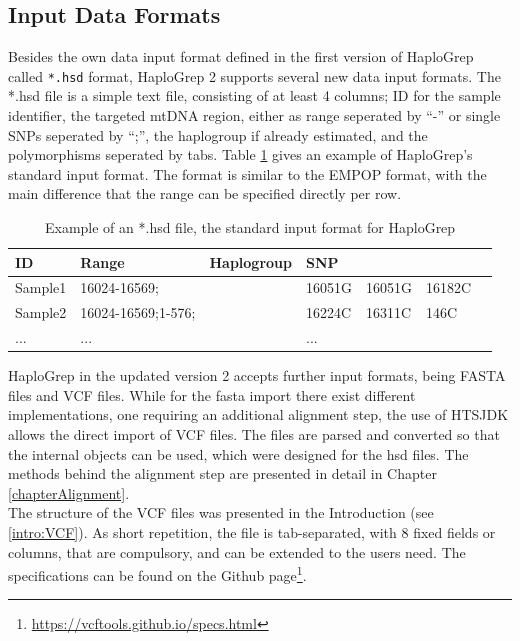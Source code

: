 \subsection{Input Data Formats}\label{hg:input}
Besides the own data input format defined in the first version of HaploGrep called \verb|*.hsd| format, HaploGrep 2 supports several new data input formats. 
The *.hsd file is a simple text file, consisting of at least 4 columns; ID for the sample identifier, the targeted mtDNA region, either as range seperated by "`-"' or single SNPs seperated by "`;"', the haplogroup if already estimated, and the polymorphisms seperated by tabs. Table \ref{table:hsd} gives an example of HaploGrep's standard input format.
The format is similar to the EMPOP format\cite{Parson2007}, with the main difference that the range can be specified directly per row.
\begin{table}[H]
  \begin{tabular}{lllllll}
    \toprule
    ID & Range & Haplogroup & SNP &  &  \\
		\midrule
	Sample1 & 16024-16569; &  & 16051G & 16051G & 16182C\\
	Sample2 & 16024-16569;1-576; &  & 16224C & 16311C & 146C\\
	... & ... & & ... & & & \\
		\bottomrule
\end{tabular}
\caption{Example of an *.hsd file, the standard input format for HaploGrep}
\label{table:hsd}
\end{table}

HaploGrep in the updated version 2 accepts further input formats, being FASTA files and VCF files. While for the fasta import there exist different implementations, one requiring an additional alignment step, the use of HTSJDK allows the direct import of VCF files. The files are parsed and converted so that the internal objects can be used, which were designed for the hsd files. The methods behind the alignment step are presented in detail in Chapter \ref{chapterAlignment}. 
\\
The structure of the VCF files was presented in the Introduction (see \ref{intro:VCF}). As short repetition, the file is tab-separated, with 8 fixed fields or columns, that are compulsory, and can be extended to the users need. The specifications can be found on the Github page\footnote{\url{https://vcftools.github.io/specs.html}}.

